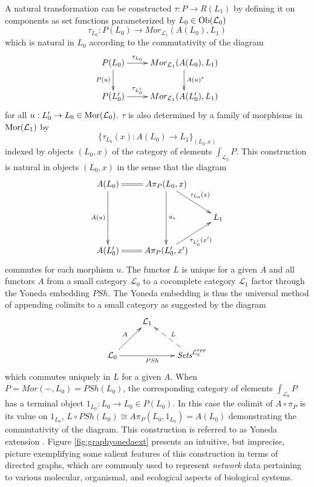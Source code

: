 \documentclass[aps,twocolumn]{revtex4-1}
\begin{document}
\iftoggle{thmsty}{
\begin{proof}
\label{proof-cocompletion-adjunction}
}{}
A natural transformation can be constructed $\tau : P \rightarrow R(L_1)$ by defining it on components as set functions parameterized by $L_0 \in \mathop{\rm Ob}\nolimits(\mathcal{L}_0)$
$$
\tau_{L_0} : P(L_0) \rightarrow Mor_{\mathcal{L}_1}(A(L_0),L_1)
$$
which is natural in $L_0$ according to the commutativity of the diagram
$$
\xymatrix{
P(L_0) \ar[r]^-{\tau_{L_0}} \ar[d]_{P(u)} & Mor_{\mathcal{L}_1}(A(L_0),L_1) \ar[d]^{A(u)^*} \\
P(L'_0) \ar[r]^-{\tau_{L'_0}} & Mor_{\mathcal{L}_1}(A(L'_0),L_1) }
$$
for all $u:L'_0 \rightarrow L_0 \in \mathop{\rm Mor}\nolimits(\mathcal{L}_0)$. $\tau$ is also determined by a family of morphisms in $\mathop{\rm Mor}\nolimits(\mathcal{L}_1)$ by
$$
\{ \tau_{L_0}(x):A(L_0) \rightarrow L_1 \}_{(L_0,x)}
$$
indexed by objects $(L_0,x)$ of the category of elements $\int_{\mathcal{L}_0} P$. This construction is natural in objects $(L_0,x)$ in the sense that the diagram
$$
\xymatrix{
A(L_0) \ar@{=}[r] \ar[dd]_{A(u)} & A\pi_P(L_0,x) \ar[rd]^{\tau_{L_0}(x)} \ar[dd]^{u_*} & \\
& & L_1 \\
A(L'_0) \ar@{=}[r] & A\pi_P(L'_0,x') \ar[ru]_{\tau_{L'_0}(x')} &
}
$$
commutes for each morphism $u$.
The functor $L$ is unique for a given $A$ and all functors $A$ from a small category $\mathcal{L}_0$ to a cocomplete category $\mathcal{L}_1$ factor through the Yoneda embedding $PSh$. The Yoneda embedding is thus the universal method of appending colimits to a small category as suggested by the diagram
$$
\xymatrix{
& \mathcal{L}_1 & \\
\mathcal{L}_0 \ar[ru]^{A} \ar[rr]_{PSh} & & \textit{Sets}^{\mathcal{L}_0^{opp}} \ar@{-->}[lu]_{L}
}
$$
which commutes uniquely in $L$ for a given $A$. When $P = Mor(-,L_0) = PSh(L_0)$, the corresponding category of elements $\int_{\mathcal{L}_0} P$ has a terminal object $1_{L_0} : L_0 \rightarrow L_0 \in P(L_0)$. In this case the colimit of $A \circ \pi_P$ is its value on $1_{L_0}$, $L \circ PSh(L_0) \cong A \pi_P (L_0,1_{L_0}) = A(L_0)$ demonstrating the commutativity of the diagram. This construction is referred to as Yoneda extension \cite{Lane1998,MacLane1992}. Figure \ref{fig:graphyonedaext} presents an intuitive, but imprecise, picture exemplifying some salient features of this construction in terms of directed graphs, which are commonly used to represent {\it network} data pertaining to various molecular, organismal, and ecological aspects of biological systems. 
\end{document}
